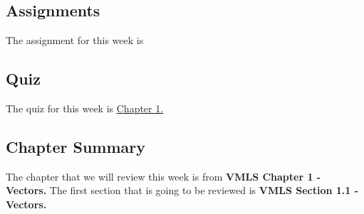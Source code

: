 \subsection{Assignments}

The assignment for this week is   

\subsection{Quiz}

The quiz for this week is \href{https://applied.cs.colorado.edu/mod/quiz/view.php?id=50674}{Chapter 1.}  

\subsection{Chapter Summary}

The chapter that we will review this week is from \textbf{VMLS Chapter 1 - Vectors.} The first section that is going to be reviewed is \textbf{VMLS Section 1.1 - Vectors.}

